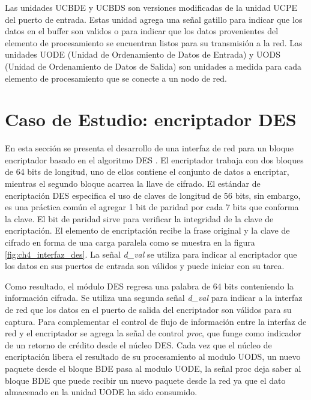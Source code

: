 Las unidades UCBDE y UCBDS son versiones modificadas de la unidad UCPE del puerto de entrada. Estas unidad agrega una señal gatillo para indicar que los datos en el buffer son validos o para indicar que los datos provenientes del elemento de procesamiento se encuentran listos para su transmisión a la red. Las unidades UODE (Unidad de Ordenamiento de Datos de Entrada) y UODS (Unidad de Ordenamiento de Datos de Salida) son unidades a medida para cada elemento de procesamiento que se conecte a un nodo de red.







\section{Caso de Estudio: encriptador DES}
	\label{sec:caso_des}

En esta sección se presenta el desarrollo de una interfaz de red para un bloque encriptador basado en el algoritmo DES \cite{chapter0:NIST:1977:DES}. El encriptador trabaja con dos bloques de 64 bits de longitud, uno de ellos contiene el conjunto de datos a encriptar, mientras el segundo bloque acarrea la llave de cifrado. El estándar de encriptación DES especifica el uso de claves de longitud de 56 bits, sin embargo, es una práctica común el agregar 1 bit de paridad por cada 7 bits que conforma la clave. El bit de paridad sirve para verificar la integridad de la clave de encriptación.
El elemento de encriptación recibe la frase original y la clave de cifrado en forma de una carga paralela como se muestra en la figura \ref{fig:ch4_interfaz_des}. La señal \textit{d\_val} se utiliza para indicar al encriptador que los datos en sus puertos de entrada son válidos y puede iniciar con su tarea.

Como resultado, el módulo DES regresa una palabra de 64 bits conteniendo la información cifrada. Se utiliza una segunda señal \textit{d\_val} para indicar a la interfaz de red que los datos en el puerto de salida del encriptador son válidos para su captura. Para complementar el control de flujo de información entre la interfaz de red y el encriptador se agrega la señal de control \textit{proc}, que funge como indicador de un retorno de crédito desde el núcleo DES. Cada vez que el núcleo de encriptación libera el resultado de su procesamiento al modulo UODS, un nuevo paquete desde el bloque BDE pasa al modulo UODE, la señal proc deja saber al bloque BDE que puede recibir un nuevo paquete desde la red ya que el dato almacenado en la unidad UODE ha sido consumido. 


